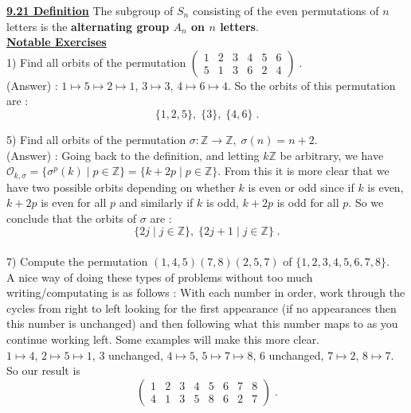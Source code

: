 \documentclass[12pt, letterpaper]{article}
\begin{document}
\noindent \underline{\bf 9.21 Definition} The subgroup of $S_n$ consisting of the even permutations of $n$ letters is the  {\bf alternating group $A_n$ on $n$ letters}. \\

\noindent \underline{\bf Notable Exercises}\\

1) Find all orbits of the permutation $\begin{pmatrix}
1&2&3&4&5&6 \\ 5&1&3&6&2&4
\end{pmatrix}\;$. \\

(Answer) : $1 \mapsto 5 \mapsto 2 \mapsto 1$, $3 \mapsto 3$, $4 \mapsto 6 \mapsto 4$. So the orbits of this permutation are : $$\{1,2,5\}, \; \{3\}, \; \{4,6\} \;.$$

5) Find all orbits of the permutation $\sigma : \mathbb{Z} \rightarrow \mathbb{Z}, \; \sigma(n) = n + 2$. \\

(Answer) : Going back to the definition, and letting $k \mathbb{Z}$ be arbitrary, we have $\mathscr{O}_{k,\sigma} = \{\sigma^p(k) \; | \; p \in \mathbb{Z} \} = \{k + 2p \; | \; p \in \mathbb{Z} \}$. From this it is more clear that we have two possible orbits depending on whether $k$ is even or odd since if $k$ is even, $k + 2p$ is even for all $p$ and similarly if $k$ is odd, $k + 2p$ is odd for all $p$. So we conclude that the orbits of $\sigma$ are : $$\{2j \; | \; j \in \mathbb{Z} \},\; \{2j + 1 \; | \; j \in \mathbb{Z} \} \;.$$ \\

7) Compute the permutation $(1,4,5)(7,8)(2,5,7)$ of $\{1,2,3,4,5,6,7,8\}$. \\

A nice way of doing these types of problems without too much writing/computating is as follows : With each number in order, work through the cycles from right to left looking for the first appearance (if no appearances then this number is unchanged) and then following what this number maps to as you continue working left. Some examples will make this more clear. \\

$1 \mapsto 4$, $2 \mapsto 5 \mapsto 1$, 3 unchanged, $4 \mapsto 5$, $5 \mapsto 7 \mapsto 8$, 6 unchanged, $7 \mapsto 2$, $8 \mapsto 7$. So our result is $$\begin{pmatrix}
1&2&3&4&5&6&7&8 \\ 4&1&3&5&8&6&2&7
\end{pmatrix}\;.$$ 
\end{document}

